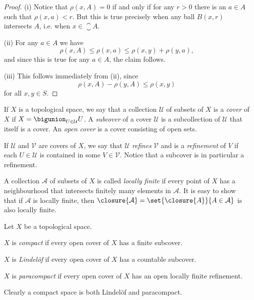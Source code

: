 \documentclass[article, a4paper, 11pt, oneside]{memoir}
\numberwithin{equation}{chapter}
\newcommand{\calU}{\mathcal{U}}
\newcommand{\calV}{\mathcal{V}}
\begin{document}
\begin{proof}
    (i) Notice that $\rho(x,A) = 0$ if and only if for any $r > 0$ there is an $a \in A$ such that $\rho(x,a) < r$. But this is true precisely when any ball $B(x,r)$ intersects $A$, i.e. when $x \in \closure{A}$.

    (ii) For any $a \in A$ we have
    \begin{equation*}
        \rho(x,A)
            \leq \rho(x,a)
            \leq \rho(x,y) + \rho(y,a),
    \end{equation*}
    and since this is true for any $a \in A$, the claim follows.

    (iii) This follows immediately from (ii), since
    \begin{equation*}
        \rho(x,A) - \rho(y,A)
            \leq \rho(x,y)
    \end{equation*}
    for all $x,y \in S$.
\end{proof}

\newcommand{\calA}{\mathcal{A}}

If $X$ is a topological space, we say that a collection $\calU$ of subsets of $X$ is a \emph{cover} of $X$ if $X = \bigunion_{U \in \calU} U$. A \emph{subcover} of a cover $\calU$ is a subcollection of $\calU$ that itself is a cover. An \emph{open cover} is a cover consisting of open sets.

If $\calU$ and $\calV$ are covers of $X$, we say that $\calU$ \emph{refines} $\calV$ and is a \emph{refinement} of $V$ if each $U \in \calU$ is contained in some $V \in \calV$. Notice that a subcover is in particular a refinement.

A collection $\calA$ of subsets of $X$ is called \emph{locally finite} if every point of $X$ has a neighbourhood that intersects finitely many elements in $\calA$. It is easy to show that if $\calA$ is locally finite, then $\closure{\calA} = \set{\closure{A}}{A \in \calA}$ is also locally finite.

\begin{definition}
    Let $X$ be a topological space.
    \begin{enumdef}
        \item $X$ is \emph{compact} if every open cover of $X$ has a finite subcover.

        \item $X$ is \emph{Lindelöf} if every open cover of $X$ has a countable subcover.

        \item $X$ is \emph{paracompact} if every open cover of $X$ has an open locally finite refinement.
    \end{enumdef}
\end{definition}
%
Clearly a compact space is both Lindelöf and paracompact.
\end{document}
